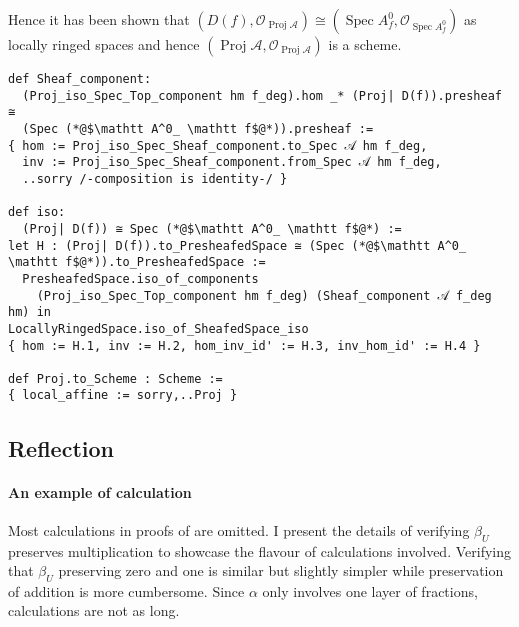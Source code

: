 \documentclass[a4paper,UKenglish,cleveref, autoref, thm-restate]{lipics-v2021}
\begin{document}
Hence it has been shown that $(D(f), \mathcal{O}_{\operatorname{Proj}\mathcal A})\cong (\operatorname{Spec}A^0_f, \mathcal{O}_{\operatorname{Spec}A^0_f})$ as locally ringed spaces and hence $(\operatorname{Proj}\mathcal A, \mathcal{O}_{\operatorname{Proj}\mathcal A})$ is a scheme.
\begin{lstlisting}
def Sheaf_component:
  (Proj_iso_Spec_Top_component hm f_deg).hom _* (Proj| D(f)).presheaf ≅
  (Spec (*@$\mathtt A^0_ \mathtt f$@*)).presheaf :=
{ hom := Proj_iso_Spec_Sheaf_component.to_Spec 𝒜 hm f_deg,
  inv := Proj_iso_Spec_Sheaf_component.from_Spec 𝒜 hm f_deg,
  ..sorry /-composition is identity-/ }

def iso:
  (Proj| D(f)) ≅ Spec (*@$\mathtt A^0_ \mathtt f$@*) :=
let H : (Proj| D(f)).to_PresheafedSpace ≅ (Spec (*@$\mathtt A^0_ \mathtt f$@*)).to_PresheafedSpace :=
  PresheafedSpace.iso_of_components
    (Proj_iso_Spec_Top_component hm f_deg) (Sheaf_component 𝒜 f_deg hm) in
LocallyRingedSpace.iso_of_SheafedSpace_iso
{ hom := H.1, inv := H.2, hom_inv_id' := H.3, inv_hom_id' := H.4 }

def Proj.to_Scheme : Scheme :=
{ local_affine := sorry,..Proj }
\end{lstlisting}


\subsection{Reflection}

\paragraph*{An example of calculation}
Most calculations in proofs of  are omitted.
I present the details of verifying $\beta_U$ preserves multiplication to showcase the flavour of calculations involved. Verifying that $\beta_U$ preserving zero and one is similar but slightly simpler while preservation of addition is more cumbersome. Since $\alpha$ only involves one layer of fractions, calculations are not as long. 
\end{document}
